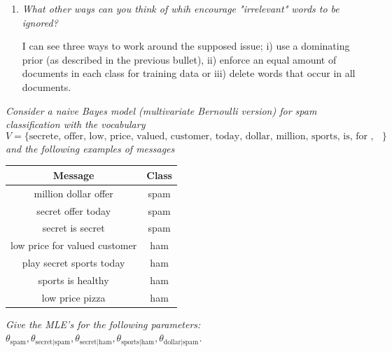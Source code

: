 \begin{example}
\begin{enumerate}
		\item \emph{What other ways can you think of whih encourage "irrelevant" words to be ignored?}\newline
		
		I can see three ways to work around the supposed issue;
		i) use a dominating prior (as described in the previous bullet), ii) enforce an equal amount of documents in each class for training data or iii) delete words that occur in all documents.
	\end{enumerate}
	
\end{example}

\begin{example}
	\emph{Consider a naive Bayes model (multivariate Bernoulli version) for spam classification with the vocabulary}
	\begin{equation}
		V = \{\text{secrete, offer, low, price, valued, customer, today, dollar, million, sports, is, for , play, healthy, pizza}\}
	\end{equation}
	\emph{and the following examples of messages}
	
	\begin{center}
		\begin{tabular}{ |c | c | }
			\hline
			Message & Class  \\
			\hline
			million dollar offer & spam  \\
			secret offer today & spam  \\
			secret is secret & spam \\
			low price for valued customer & ham \\
			play secret sports today & ham \\
			sports is healthy & ham \\
			low price pizza & ham \\
			\hline
		\end{tabular}
	\end{center}
	
	\emph{Give the MLE's for the following parameters: $\theta_{\text{spam}}, \theta_{\text{secret|spam}}, \theta_{\text{secret|ham}}, \theta_{\text{sports|ham}}, \theta_{\text{dollar|spam}}$.}\newline
	

\end{example}
